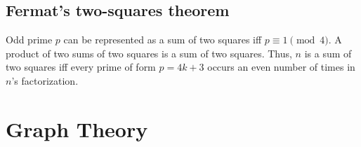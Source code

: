 \documentclass[12pt]{extarticle}
\begin{document}
\begin{multicols*}{2}
\subsection{Fermat's two-squares theorem}  Odd prime $p$ can be represented
as a sum of two squares iff $p \equiv 1 {\pmod 4}$.
A product of two sums of two squares is a sum of two squares.
Thus, $n$ is a sum of two squares iff every prime of
form $p=4k+3$ occurs an even number of times in $n$'s factorization.











\section{Graph Theory}


\end{multicols*}
\end{document}
